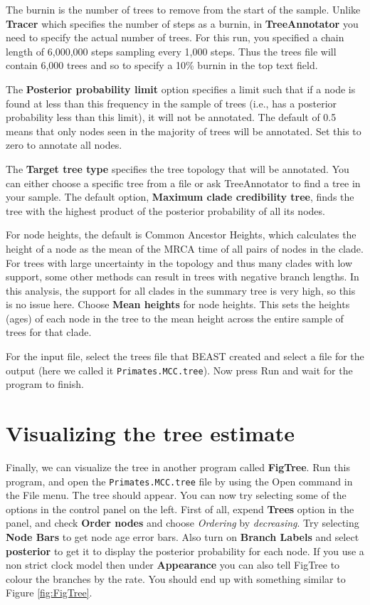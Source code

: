 \documentclass[11pt]{article}
\theoremstyle{plain}%
\theoremstyle{definition}
\theoremstyle{remark}
\newcommand{\chainLength}{{6,000,000}}
\newcommand{\logEvery}{{1,000}}
\newcommand{\tracesNumber}{{6,000}} %
\newcommand{\mccTree}{{\texttt{Primates.MCC.tree}}}
\begin{document}
The burnin is the number of trees to remove from the start of the sample. Unlike {\bf Tracer} which specifies the number of
steps as a burnin, in {\bf TreeAnnotator} you need to specify the actual number of trees. For this run, you specified a chain
length of \chainLength{} steps sampling every \logEvery{} steps. Thus the trees file will contain \tracesNumber{} trees and so to specify a 10\% burnin
in the top text field.

The {\bf Posterior probability limit} option specifies a limit such that if a node is found at less than this frequency in the sample
of trees (i.e., has a posterior probability less than this limit), it will not be annotated. The default of 0.5 means that only nodes
seen in the majority of trees will be annotated. Set this to zero to annotate all nodes.

The {\bf Target tree type} specifies the tree topology that will be annotated. You can either choose a specific tree from a file or ask TreeAnnotator to find a tree in your sample.
The default option, {\bf Maximum clade credibility tree}, finds the tree with the highest product of the posterior probability of
all its nodes.

For node heights, the default is Common Ancestor Heights, which calculates
the height of a node as the mean of the MRCA time of all pairs of nodes in
the clade. For trees with large uncertainty in the topology and thus many clades
with low support, some other methods can result in trees with negative branch
lengths. In this analysis, the support for all clades in the summary tree is very
high, so this is no issue here.
Choose {\bf Mean heights} for node heights. This sets the heights (ages) of each node in the tree to the mean height across the
entire sample of trees for that clade.

For the input file, select the trees file that BEAST created and select a file for the
output (here we called it \mccTree{}). Now press Run and wait for the program to finish.

\section{Visualizing the tree estimate}

Finally, we can visualize the tree in another program called {\bf FigTree}. Run this program, and open
the \mccTree{} file by using the Open command in the File menu. The tree should appear.
You can now try selecting some of the options in the control panel on the left. 
First of all, expend {\bf Trees} option in the panel, and check {\bf Order nodes} and choose \textit{Ordering} by \textit{decreasing}. 
Try selecting {\bf Node Bars} to get node age error bars. Also turn on {\bf Branch Labels} and select {\bf posterior} to get
it to display the posterior probability for each node. 
If you use a non strict clock model then under {\bf Appearance} you can also tell FigTree to colour the branches by the rate.
You should end up with something similar to Figure \ref{fig:FigTree}.
\end{document}
